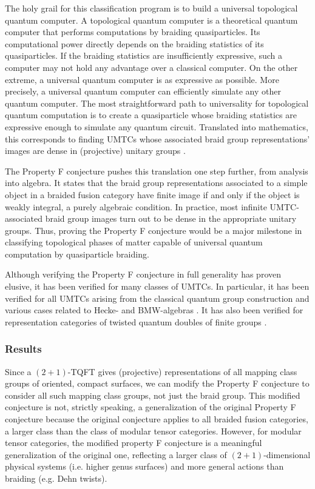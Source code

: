 \documentclass[12pt]{article}
\theoremstyle{plain} \numberwithin{equation}{section}
\theoremstyle{definition}
\begin{document}
The holy grail for this classification program is to build a universal topological quantum computer.  A topological quantum computer is a theoretical quantum computer that performs computations by braiding quasiparticles. Its computational power directly depends on the braiding statistics of its quasiparticles. If the braiding statistics are insufficiently expressive, such a  computer may not hold any advantage over a classical computer. On the other extreme, a universal quantum computer is as expressive as possible. More precisely, a universal quantum computer can efficiently simulate any other quantum computer.  The most straightforward path to universality for topological quantum computation is to create a quasiparticle whose braiding statistics are expressive enough to simulate any quantum circuit.  Translated into mathematics, this corresponds to finding UMTCs whose associated braid group representations' images are dense in (projective) unitary groups \cite{flw}.

The Property F conjecture \cite{nr} pushes this translation one step further, from analysis into algebra.  It states that the braid group representations associated to a simple object in a braided fusion category have finite image if and only if the object is weakly integral, a purely algebraic condition.  In practice, most infinite UMTC-associated braid group images turn out to be dense in the appropriate unitary groups.  Thus, proving the Property F conjecture would be a major milestone in classifying topological phases of matter capable of universal quantum computation by quasiparticle braiding.

Although verifying the Property F conjecture in full generality has proven elusive, it has been verified for many classes of UMTCs.  In particular, it has been verified for all UMTCs arising from the classical quantum group construction and various cases related to Hecke- and BMW-algebras \cite{FRW, flw, jones86, jonescmp, LRW, r, rw}.  It has also been verified for representation categories of twisted quantum doubles of finite groups \cite{erw}.

\subsubsection*{Results}

Since a $(2+1)$-TQFT gives (projective) representations of all mapping class groups of oriented, compact surfaces, we can modify the Property F conjecture to consider all such mapping class groups, not just the braid group. This modified conjecture is not, strictly speaking, a generalization of the original Property F conjecture because the original conjecture applies to all braided fusion categories, a larger class than the class of modular tensor categories.   However, for modular tensor categories, the modified property F conjecture is a meaningful generalization of the original one, reflecting a larger class of $(2+1)$-dimensional physical systems (i.e. higher genus surfaces) and more general actions than braiding (e.g. Dehn twists).
\end{document}
